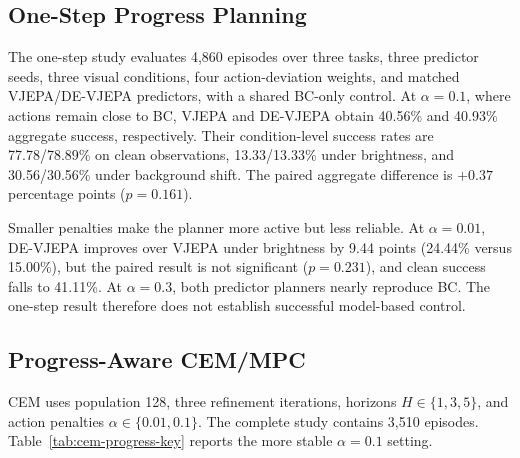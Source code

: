 \documentclass[10pt,twocolumn]{article}
\theoremstyle{tightstyle}
\begin{document}
\subsection{One-Step Progress Planning}

The one-step study evaluates 4,860 episodes over three tasks, three predictor
seeds, three visual conditions, four action-deviation weights, and matched
VJEPA/DE-VJEPA predictors, with a shared BC-only control. At
$\alpha=0.1$, where actions remain close to BC, VJEPA and DE-VJEPA obtain
40.56\% and 40.93\% aggregate success, respectively. Their condition-level
success rates are 77.78/78.89\% on clean observations, 13.33/13.33\% under
brightness, and 30.56/30.56\% under background shift. The paired aggregate
difference is $+0.37$ percentage points ($p=0.161$).

Smaller penalties make the planner more active but less reliable. At
$\alpha=0.01$, DE-VJEPA improves over VJEPA under brightness by 9.44 points
(24.44\% versus 15.00\%), but the paired result is not significant
($p=0.231$), and clean success falls to 41.11\%. At $\alpha=0.3$, both
predictor planners nearly reproduce BC. The one-step result therefore does not
establish successful model-based control.

\subsection{Progress-Aware CEM/MPC}

CEM uses population 128, three refinement iterations, horizons
$H\in\{1,3,5\}$, and action penalties $\alpha\in\{0.01,0.1\}$. The complete
study contains 3,510 episodes. Table~\ref{tab:cem-progress-key} reports the
more stable $\alpha=0.1$ setting.

\begin{table}[t]
\centering
\caption{Progress-aware CEM success rates (\%) at $\alpha=0.1$. Each
method--horizon--condition cell contains 90 episodes.}
\label{tab:cem-progress-key}
\end{table}
\end{document}
